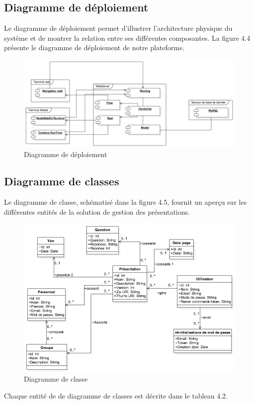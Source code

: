\documentclass[12pt, ChapStyle1, oneside]{./Styles/Dea_Gsm}
\begin{document}
\subsection{Diagramme de déploiement}
Le diagramme de déploiement permet d'illustrer l'architecture physique du système et de montrer la relation entre ses différentes composantes. La figure 4.4 présente le diagramme de déploiement de notre plateforme.

\begin{figure}[H]
    \centering
    \includegraphics[width=6.0in]{DeploymentDiagram}
    \caption{Diagramme de déploiement}
    \label{diagdeploit}
\end{figure}
\pagebreak
\subsection{Diagramme de classes}
Le diagramme de classe, schématisé dans la figure 4.5, fournit un aperçu sur les différentes entités de la solution de gestion des présentations.
\begin{figure}[H]
    \centering
    \includegraphics[width=6.0in]{diagclass}
    \caption{Diagramme de classe}
    \label{diagclass}
\end{figure}
\pagebreak
Chaque entité de de diagramme de classes est décrite dans le tableau 4.2.
\end{document}
